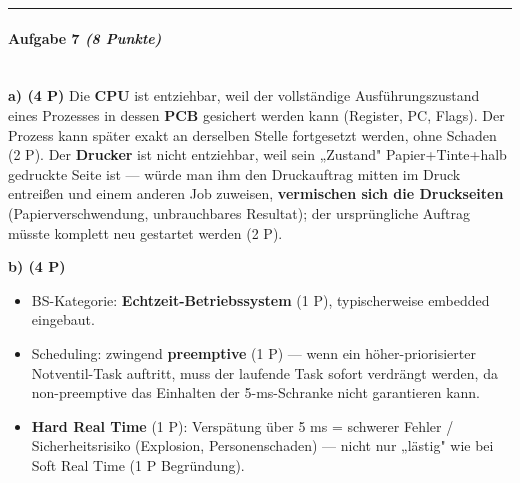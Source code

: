 \documentclass[11pt, a4paper]{article}
\begin{document}
\noindent\textcolor{rulegray}{\rule{\linewidth}{0.4pt}}


\paragraph{Aufgabe 7 \textit{(8 Punkte)}}\mbox{}\\[2pt]

\textbf{a) (4 P)} Die \textbf{CPU} ist entziehbar, weil der vollständige Ausführungszustand eines Prozesses in dessen \textbf{PCB} gesichert werden kann (Register, PC, Flags). Der Prozess kann später exakt an derselben Stelle fortgesetzt werden, ohne Schaden (2 P). Der \textbf{Drucker} ist nicht entziehbar, weil sein „Zustand" Papier+Tinte+halb gedruckte Seite ist — würde man ihm den Druckauftrag mitten im Druck entreißen und einem anderen Job zuweisen, \textbf{vermischen sich die Druckseiten} (Papierverschwendung, unbrauchbares Resultat); der ursprüngliche Auftrag müsste komplett neu gestartet werden (2 P).


\textbf{b) (4 P)}

\begin{itemize}
  \item BS-Kategorie: \textbf{Echtzeit-Betriebssystem} (1 P), typischerweise embedded eingebaut.
  \item Scheduling: zwingend \textbf{preemptive} (1 P) — wenn ein höher-priorisierter Notventil-Task auftritt, muss der laufende Task sofort verdrängt werden, da non-preemptive das Einhalten der 5-ms-Schranke nicht garantieren kann.
  \item \textbf{Hard Real Time} (1 P): Verspätung über 5 ms = schwerer Fehler / Sicherheitsrisiko (Explosion, Personenschaden) — nicht nur „lästig" wie bei Soft Real Time (1 P Begründung).
\end{itemize}




\end{document}
